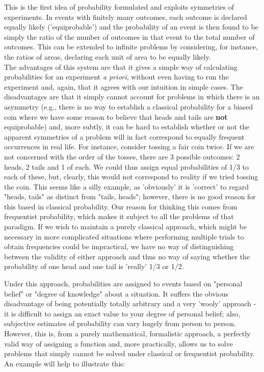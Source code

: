\documentclass[12pt,a4paper]{article}
\begin{document}
This is the first idea of probability formulated and exploits symmetries of experiments. In events with finitely many outcomes, each outcome is declared equally likely ('equiprobable') and the probability of an event is then found to be simply the ratio of the number of outcomes in that event to the total number of outcomes. This can be extended to infinite problems by considering, for instance, the ratios of areas, declaring each unit of area to be equally likely.\\
\indent The advantages of this system are that it gives a simple way of calculating probabilities for an experiment {\it a priori}, without even having to run the experiment and, again, that it agrees with our intuition in simple cases. The disadvantages are that it simply cannot account for problems in which there is an asymmetry (e.g., there is no way to establish a classical probability for a biased coin where we have some reason to believe that heads and tails are {\bf not} equiprobable) and, more subtly, it can be hard to establish whether or not the apparent symmetries of a problem will in fact correspond to equally frequent occurrences in real life. For instance, consider tossing a fair coin twice. If we are not concerned with the order of the tosses, there are 3 possible outcomes: 2 heads, 2 tails and 1 of each. We could thus assign equal probabilities of 1/3 to each of these, but, clearly, this would not correspond to reality if we tried tossing the coin. This seems like a silly example, as 'obviously' it is 'correct' to regard "heads, tails" as distinct from "tails, heads"; however, there is no good reason for this based in classical probability. Our reason for thinking this comes from frequentist probability, which makes it subject to all the problems of that paradigm. If we wish to maintain a purely classical approach, which might be necessary in more complicated situations where performing multiple trials to obtain frequencies could be impractical, we have no way of distinguishing between the validity of either approach and thus no way of saying whether the probability of one head and one tail is 'really' 1/3 or 1/2.\par
\vspace{12pt}

\par
\vspace{12pt}

Under this approach, probabilities are assigned to events based on "personal belief" or "degree of knowledge" about a situation. It suffers the obvious disadvantage of being potentially totally arbitrary and a very 'wooly' approach - it is difficult to assign an exact value to your degree of personal belief; also, subjective estimates of probability can vary hugely from person to person. However, this is, from a purely mathematical, formalistic approach, a perfectly valid way of assigning a function and, more practically, allows us to solve problems that simply cannot be solved under classical or frequentist probability. An example will help to illustrate this:
\end{document}
